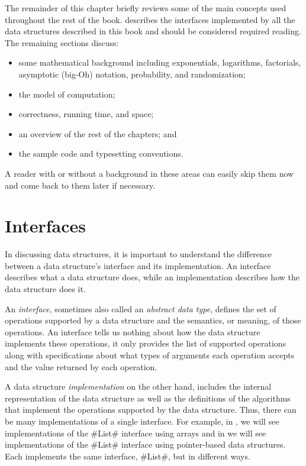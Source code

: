 The remainder of this chapter briefly reviews some of the main concepts
used throughout the rest of the book.    describes
the interfaces implemented by all the data structures described in this
book and should be considered required reading.  The remaining sections
discuss:
\begin{itemize}
  \item some mathematical background including exponentials, logarithms,
  factorials, asymptotic (big-Oh) notation, probability, and randomization;
  \item the model of computation; 
  \item correctness, running time, and space;
  \item an overview of the rest of the chapters; and
  \item the sample code and typesetting conventions.
\end{itemize}
A reader with or without a background in these areas can easily skip
them now and come back to them later if necessary.


\section{Interfaces}

In discussing data structures, it is important to understand the
difference between a data structure's interface and its implementation.
An interface describes what a data structure does, while an implementation
describes how the data structure does it.

An \emph{interface}, sometimes also called an \emph{abstract data type},
defines the set of operations supported by a data structure and
the semantics, or meaning, of those operations.  An interface tells us
nothing about how the data structure implements these operations, it only
provides the list of supported operations along with specifications
about what types of arguments each operation accepts and the value
returned by each operation.

A data structure \emph{implementation} on the other hand, includes the
internal representation of the data structure as well as the definitions
of the algorithms that implement the operations supported by the data
structure.  Thus, there can be many implementations of a single interface.
For example, in , we will see implementations of the
#List# interface using arrays and in  we will
see implementations of the #List# interface using pointer-based data
structures.  Each implements the same interface, #List#,
but in different ways.

